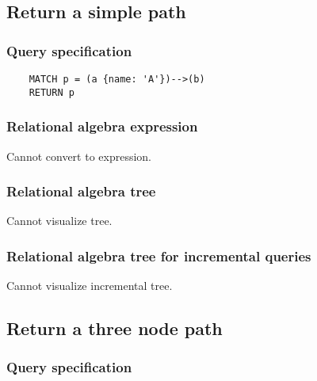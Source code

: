 	\subsection{Return a simple path}

	\subsubsection*{Query specification}

	\begin{lstlisting}
	MATCH p = (a {name: 'A'})-->(b)
	RETURN p
	\end{lstlisting}


	\subsubsection*{Relational algebra expression}

	Cannot convert to expression.

	\subsubsection*{Relational algebra tree}

	Cannot visualize tree.

	\subsubsection*{Relational algebra tree for incremental queries}

	Cannot visualize incremental tree.
	\subsection{Return a three node path}

	\subsubsection*{Query specification}

